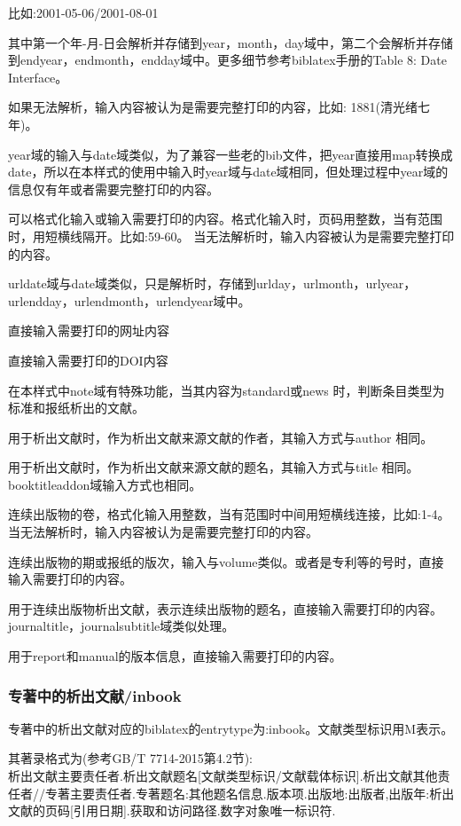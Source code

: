 \documentclass[11pt]{article} %
\begin{document}
\begin{description}[topsep=5pt,partopsep=0pt,parsep=0pt,%
itemsep=0pt,leftmargin=2.2cm,rightmargin=0.5cm,labelwidth=2cm]
      比如:2001-05-06/2001-08-01

      其中第一个年-月-日会解析并存储到year，month，day域中，第二个会解析并存储到endyear，endmonth，endday域中。更多细节参考biblatex手册的Table 8: Date Interface。

      如果无法解析，输入内容被认为是需要完整打印的内容，比如:
      1881(清光绪七年)。

      year域的输入与date域类似，为了兼容一些老的bib文件，把year直接用map转换成date，所以在本样式的使用中输入时year域与date域相同，但处理过程中year域的信息仅有年或者需要完整打印的内容。

  \item[pages] 可以格式化输入或输入需要打印的内容。格式化输入时，页码用整数，当有范围时，用短横线隔开。比如:59-60。 当无法解析时，输入内容被认为是需要完整打印的内容。
  \item[urldate] urldate域与date域类似，只是解析时，存储到urlday，urlmonth，urlyear，urlendday，urlendmonth，urlendyear域中。
  \item[url] 直接输入需要打印的网址内容
  \item[doi] 直接输入需要打印的DOI内容
  \item[note] 在本样式中note域有特殊功能，当其内容为standard或news 时，判断条目类型为标准和报纸析出的文献。
  \item[bookauthor] 用于析出文献时，作为析出文献来源文献的作者，其输入方式与author 相同。
  \item[booktitle] 用于析出文献时，作为析出文献来源文献的题名，其输入方式与title 相同。booktitleaddon域输入方式也相同。
  \item[volume] 连续出版物的卷，格式化输入用整数，当有范围时中间用短横线连接，比如:1-4。当无法解析时，输入内容被认为是需要完整打印的内容。
  \item[number] 连续出版物的期或报纸的版次，输入与volume类似。或者是专利等的号时，直接输入需要打印的内容。
  \item[journal] 用于连续出版物析出文献，表示连续出版物的题名，直接输入需要打印的内容。journaltitle，journalsubtitle域类似处理。
   \item[version] 用于report和manual的版本信息，直接输入需要打印的内容。
\end{description}

\subsubsection{专著中的析出文献/inbook}
\begin{refentry}{}{}
专著中的析出文献对应的biblatex的entrytype为:inbook。文献类型标识用M表示。

其著录格式为(参考GB/T 7714-2015第4.2节):\\
析出文献主要责任者.析出文献题名[文献类型标识/文献载体标识].析出文献其他责任者//专著主要责任者.专著题名:其他题名信息.版本项.出版地:出版者,出版年:析出文献的页码[引用日期].获取和访问路径.数字对象唯一标识符.
\end{refentry}
\end{document}

